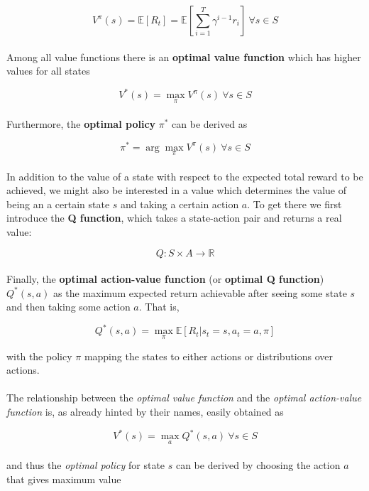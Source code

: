 \begin{equation}\label{eq:value-function}
V^{\pi}(s)=\mathbb{E}[R_t]=\mathbb{E}[\sum_{i=1}^{T}{\gamma^{i-1}{r_{i}}}]\ \forall s \in S
\end{equation}
\\
Among all value functions there is an \textbf{optimal value function} which has higher values for all states

\begin{equation}\label{eq:optimal-value-function}
V^{*}(s)=\max_{\pi}V^{\pi}(s)\ \forall s \in S
\end{equation}
\\
Furthermore, the \textbf{optimal policy} $\pi^*$ can be derived as

\begin{equation}\label{eq:value-function-policy}
\pi^{*}=\arg\max_{\pi}V^{\pi}(s)\ \forall{s}\in{S}
\end{equation}
\\
In addition to the value of a state with respect to the expected total reward to be achieved, we might also be interested in a value which determines the value of being an a certain state $s$ and taking a certain action $a$. 
To get there we first introduce the \textbf{Q function}, which takes a state-action pair and returns a real value:

\begin{equation}\label{eq:q-function}
Q:S\times{A}\rightarrow{\mathbb{R}}
\end{equation}
\\
Finally, the \textbf{optimal action-value function} (or \textbf{optimal Q function}) $Q^*(s,a)$ as the maximum expected return achievable after seeing some state $s$ and then taking some action $a$. That is, 

\begin{equation}\label{eq:optimal-action-value-function}
Q^*(s,a)=\max_{\pi}\mathbb{E} [ R_t | s_t=s, a_t=a, \pi ]
\end{equation}

with the policy $\pi$ mapping the states to either actions or distributions over actions. 
\\
\\
The relationship between the \textit{optimal value function} and the \textit{optimal action-value function} is, as already hinted by their names, easily obtained as

\begin{equation}
V^*(s)=\max_{a}Q^*(s,a)\ \forall{s}\in{S}
\end{equation}
\\
and thus the \textit{optimal policy} for state $s$ can be derived by choosing the action $a$ that gives maximum value


